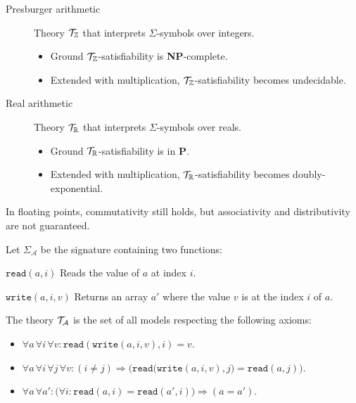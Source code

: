 \begin{description}
        \begin{description}
            \item[Presburger arithmetic]
                Theory $\mathcal{T}_\mathbb{Z}$ that interprets $\Sigma$-symbols over integers.
                \begin{itemize}
                    \item Ground $\mathcal{T}_\mathbb{Z}$-satisfiability is \textbf{NP}-complete.
                    \item Extended with multiplication, $\mathcal{T}_\mathbb{Z}$-satisfiability becomes undecidable.
                \end{itemize}
            \item[Real arithmetic]
                Theory $\mathcal{T}_\mathbb{R}$ that interprets $\Sigma$-symbols over reals.
                \begin{itemize}
                    \item Ground $\mathcal{T}_\mathbb{R}$-satisfiability is in \textbf{P}.
                    \item Extended with multiplication, $\mathcal{T}_\mathbb{R}$-satisfiability becomes doubly-exponential.
                \end{itemize}
        \end{description}
        
        \begin{remark}
            In floating points, commutativity still holds, but associativity and distributivity are not guaranteed.
        \end{remark}


    \item[Array theory] 
        Let $\Sigma_\mathcal{A}$ be the signature containing two functions:
        \begin{descriptionlist}
            \item[$\texttt{read}(a, i)$] Reads the value of $a$ at index $i$.
            \item[$\texttt{write}(a, i, v)$] Returns an array $a'$ where the value $v$ is at the index $i$ of $a$.
        \end{descriptionlist}
        
        The theory $\mathcal{T}_\mathcal{A}$ is the set of all models respecting the following axioms:
        \begin{itemize}
            \item $\forall a\, \forall i\, \forall v: \texttt{read}(\texttt{write}(a, i, v), i) = v$.
            \item $\forall a\, \forall i\, \forall j\, \forall v: (i \neq j) \Rightarrow \Big( \texttt{read}\big( \texttt{write}(a,i,v), j \big) = \texttt{read}(a, j) \Big)$.
            \item $\forall a\, \forall a': \big( \forall i: \texttt{read}(a, i) = \texttt{read}(a', i) \big) \Rightarrow (a = a')$.
        \end{itemize}
        

\end{description}
